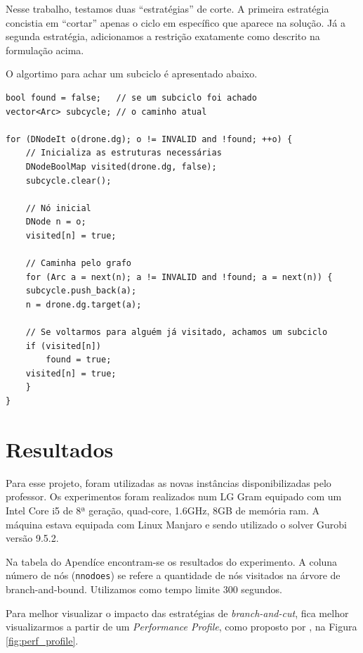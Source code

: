 \documentclass[11pt]{article}
\begin{document}
Nesse trabalho, testamos duas ``estratégias'' de corte. A primeira estratégia concistia em ``cortar'' apenas o ciclo em específico que aparece na solução. Já a segunda estratégia, adicionamos a restrição exatamente como descrito na formulação acima.

O algortimo para achar um subciclo é apresentado abaixo.

\begin{verbatim}
bool found = false;   // se um subciclo foi achado
vector<Arc> subcycle; // o caminho atual

for (DNodeIt o(drone.dg); o != INVALID and !found; ++o) {
    // Inicializa as estruturas necessárias
    DNodeBoolMap visited(drone.dg, false);
    subcycle.clear();

    // Nó inicial
    DNode n = o;
    visited[n] = true;

    // Caminha pelo grafo
    for (Arc a = next(n); a != INVALID and !found; a = next(n)) {
    subcycle.push_back(a);
    n = drone.dg.target(a);

    // Se voltarmos para alguém já visitado, achamos um subciclo
    if (visited[n])
        found = true;
    visited[n] = true;
    }
}
\end{verbatim}

\section{Resultados}
\label{sec:org56453a8}
Para esse projeto, foram utilizadas as novas instâncias disponibilizadas pelo professor. Os experimentos foram realizados num LG Gram equipado com um Intel Core i5 de 8ª geração, quad-core, 1.6GHz, 8GB de memória ram. A máquina estava equipada com Linux Manjaro e sendo utilizado o solver Gurobi versão 9.5.2.

Na tabela do Apendíce encontram-se os resultados do experimento. A coluna número de nós (\texttt{nnodoes}) se refere a quantidade de nós visitados na árvore de branch-and-bound. Utilizamos como tempo limite \(300\) segundos.

Para melhor visualizar o impacto das estratégias de \emph{branch-and-cut}, fica melhor visualizarmos a partir de um \emph{Performance Profile}, como proposto por \textcite{Dolan2002Benchmarkingoptimizationsoftware}, na Figura \ref{fig:perf_profile}.
\end{document}
